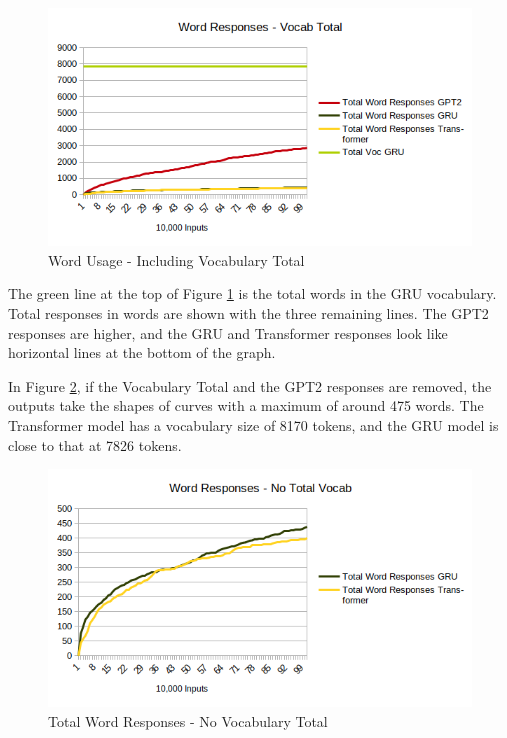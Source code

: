 \begin{figure}[H]
	\begin{center}
		\includegraphics[scale=0.75]{diagram-output-total-responses-01}
		
		
	\end{center}
	\caption[Word Usage]{Word Usage - Including Vocabulary Total}
	\label{diagram-words-with-voc-total}
	
\end{figure}

The green line at the top of Figure \ref{diagram-words-with-voc-total} is the total words in the GRU vocabulary. %
Total responses in words are shown with the three remaining lines. The GPT2 responses are higher, and the GRU and Transformer responses look like horizontal lines at the bottom of the graph.

In Figure \ref{diagram-words-no-voc-total}, if the Vocabulary Total and the GPT2 responses are removed, the outputs take the shapes of curves with a maximum of around 475 words. The Transformer model has a vocabulary size of 8170 tokens, and the GRU model is close to that at 7826 tokens. %


\begin{figure}[H]
	\begin{center}
		\includegraphics[scale=0.75]{diagram-output-total-responses-02}
		
		
	\end{center}
	\caption[Total Word Responses]{Total Word Responses - No Vocabulary Total}
	\label{diagram-words-no-voc-total}
	
\end{figure}

